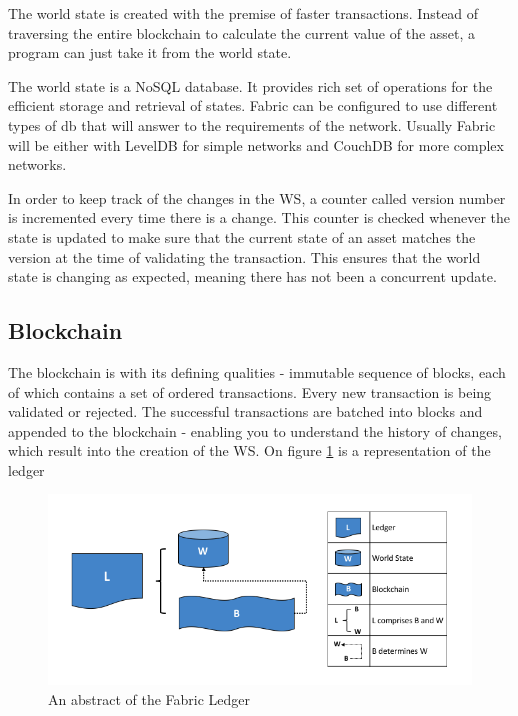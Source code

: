 \documentclass[a4paper,11pt]{report}
\begin{document}
The world state is created with the premise of faster transactions. Instead of traversing the entire blockchain to calculate the current value of the asset, a program can just take it from the world state.

The world state is a NoSQL database. It provides rich set of operations for the efficient storage and retrieval of states. Fabric can be configured to use different types of db that will answer to the requirements of the network. Usually Fabric will be either with LevelDB for simple networks and CouchDB for more complex networks.

In order to keep track of the changes in the WS, a counter called version number is incremented every time there is a change. This counter is checked whenever the state is updated to make sure that the current state of an asset matches the version at the time of validating the transaction. This ensures that the world state is changing as expected, meaning there has not been a concurrent update. \cite{fabledger}

\subsection{Blockchain}

The blockchain is with its defining qualities - immutable sequence of blocks, each of which contains a set of ordered transactions. Every new transaction is being validated or rejected. The successful transactions are batched into blocks and appended to the blockchain - enabling you to understand the history of changes, which result into the creation of the WS. On figure \ref{fabricLedger} is a representation of the ledger

\begin{figure}[h]
\centering
  \includegraphics[width=16cm]{ledgerdiagram1.png}
  \caption{An abstract of the Fabric Ledger \cite{fabledger}}
  \label{fabricLedger}
\end{figure}
\end{document}
